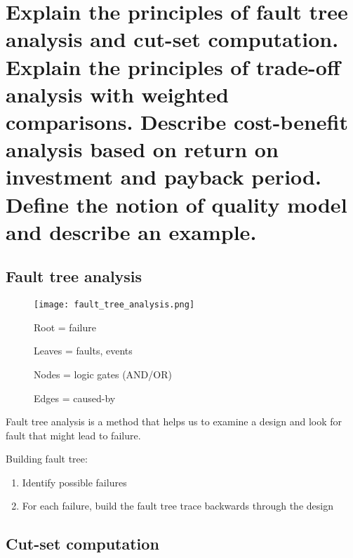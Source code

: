 \clearpage{}
\section{Explain the principles of fault tree analysis and cut-set
computation. Explain the principles of trade-off analysis with weighted
comparisons. Describe cost-benefit analysis based on return on
investment and payback period. Define the notion of quality model and
describe an example.}

\subsection{Fault tree analysis}

\begin{figure}[!ht]
    \begin{minipage}{\linewidth}
        \begin{minipage}{0.45\linewidth}
            \centering
            \texttt{[image: fault\_tree\_analysis.png]}
        \end{minipage}
        \begin{minipage}{0.45\linewidth}
            Root = failure

            Leaves = faults, events

            Nodes = logic gates (AND/OR)

            Edges = caused-by
        \end{minipage}
    \end{minipage}
\end{figure}

Fault tree analysis is a method that helps us to examine a design and look for fault that might lead to failure. \newline

Building fault tree:

\begin{enumerate}
    \item Identify possible failures
    \item For each failure, build the fault tree trace backwards through the design
\end{enumerate}

\subsection{Cut-set computation}

